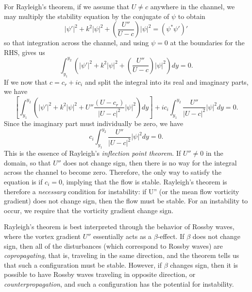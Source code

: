 \documentclass[letterpaper, 11pt, onecolumn]{article}
\begin{document}
For Rayleigh's theorem, if we assume that $U \neq c$ anywhere in the channel, we may multiply the stability equation by the conjugate of $\psi$ to obtain
\begin{equation*}
|\psi'|^2 + k^2 |\psi|^2 + \left(\frac{U''}{U - c} \right)|\psi|^2 = (\psi^* \psi')'
\end{equation*}
so that integration across the channel, and using $\psi = 0$ at the boundaries for the RHS, gives us
\begin{equation*}
\int_{y_1}^{y_2} \left(|\psi'|^2 + k^2 |\psi|^2 + \left(\frac{U''}{U - c} \right)|\psi|^2 \right) dy = 0.
\end{equation*}
If we now that $c = c_r + i c_i$ and split the integral into its real and imaginary parts, we have
\begin{equation*}
\left[\int_{y_1}^{y_2} \left(|\psi'|^2 + k^2 |\psi|^2 + U'' \frac{(U - c_r)}{|U - c|^2}|\psi|^2 \right) dy \right] + i c_i \int_{y_1}^{y_2} \frac{U''}{|U - c|^2} |\psi|^2 dy = 0.
\end{equation*}
Since the imaginary part must individually be zero, we have
\begin{equation}
c_i \int_{y_1}^{y_2} \frac{U''}{|U-c|^2} |\psi|^2 dy = 0.
\end{equation}
This is the essence of Rayleigh's \emph{inflection point theorem}. If $U'' \neq 0$ in the domain, so that $U''$ does not change sign, then there is no way for the integral across the channel to become zero. Therefore, the only way to satisfy the equation is if $c_i = 0$, implying that the flow is stable. Rayleigh's theorem is therefore a \emph{necessary} condition for instability: if U'' (or the mean flow vorticity gradient) does not change sign, then the flow must be stable. For an instability to occur, we require that the vorticity gradient change sign.

Rayleigh's theorem is best interpreted through the behavior of Rossby waves, where the vortex gradient $U''$ essentially acts as a $\beta$-effect. If $\beta$ does not change sign, then all of the disturbances (which correspond to Rossby waves) are \emph{copropagating}, that is, traveling in the same direction, and the theorem tells us that such a configuration must be stable. However, if $\beta$ changes sign, then it is possible to have Rossby waves traveling in opposite direction, or \emph{counterpropagation}, and such a configuration has the potential for instability.
\end{document}
